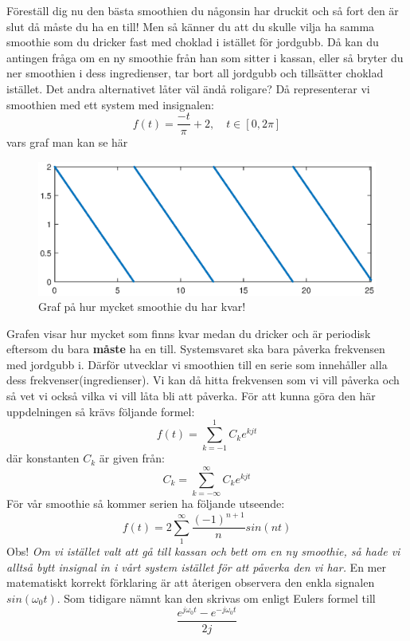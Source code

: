 \documentclass{article}
\begin{document}
Föreställ dig nu den bästa smoothien du någonsin har druckit och så fort den är slut då måste du ha en till! Men så känner du att du skulle vilja ha samma smoothie som du dricker fast med choklad i istället för jordgubb. Då kan du antingen fråga om en ny smoothie från han som sitter i kassan, eller så bryter du ner smoothien i dess ingredienser, tar bort all jordgubb och tillsätter choklad istället. Det andra alternativet låter väl ändå roligare? 
Då representerar vi smoothien med ett system med insignalen:
\[ f(t) = \frac{-t}{\pi} + 2, \quad t \in [0,2 \pi] \]
vars graf man kan se här %
\begin{figure}[ht]
\centerline{\includegraphics[scale=0.55]{smoothie.eps}}
\caption{Graf på hur mycket smoothie du har kvar!}
\label{}
\end{figure}
Grafen visar hur mycket som finns kvar medan du dricker och är periodisk eftersom du bara \textbf{måste} ha en till. Systemsvaret ska bara påverka frekvensen med jordgubb i. Därför utvecklar vi smoothien till en serie som innehåller alla dess frekvenser(ingredienser). Vi kan då hitta frekvensen som vi vill påverka och så vet vi också vilka vi vill låta bli att påverka. För att kunna göra den här uppdelningen så krävs följande formel:
\[ f(t) = \sum_{k=-1}^1 C_k e^{k j t} \]
där konstanten $C_k$ är given från:
\[C_k = \sum_{k=-\infty}^{\infty} C_k e^{k j t}\] %
För vår smoothie så kommer serien ha följande utseende:
\[f(t) = 2 \sum_{1}^{\infty} \frac{(-1)^{n+1}}{n} sin(n t) \]
Obs! \emph{Om vi istället valt att gå till kassan och bett om en ny smoothie, så hade vi alltså bytt insignal in i vårt system istället för att påverka den vi har.}
En mer matematiskt korrekt förklaring är att återigen observera den enkla signalen $sin(\omega_0 t)$. Som tidigare nämnt kan den skrivas om enligt Eulers formel till
\[ \frac{e^{j \omega_0 t} - e^{-j \omega_0 t}}{2j}\]
\end{document}
